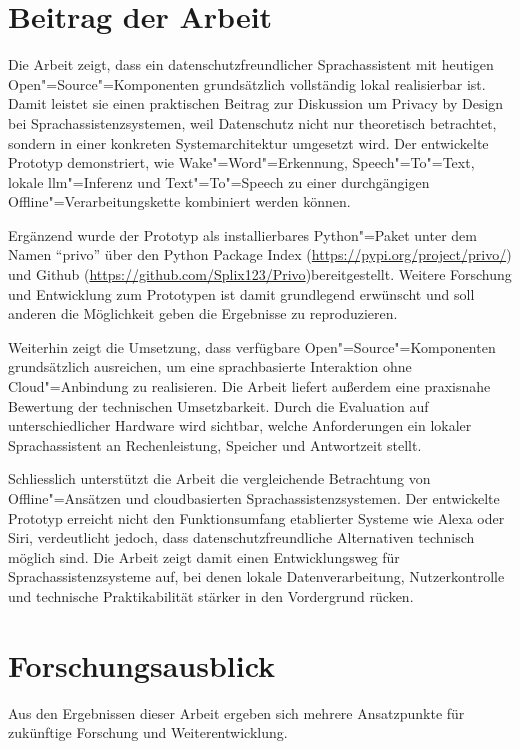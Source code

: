 \section{Beitrag der Arbeit}
\label{sec:Beitrag_der_Arbeit}
Die Arbeit zeigt, dass ein datenschutzfreundlicher Sprachassistent mit heutigen Open"=Source"=Komponenten grundsätzlich vollständig lokal realisierbar ist. Damit leistet sie einen praktischen Beitrag zur Diskussion um Privacy by Design bei Sprachassistenzsystemen, weil Datenschutz nicht nur theoretisch betrachtet, sondern in einer konkreten Systemarchitektur umgesetzt wird. Der entwickelte Prototyp demonstriert, wie Wake"=Word"=Erkennung, Speech"=To"=Text, lokale \gls{llm}"=Inferenz und Text"=To"=Speech zu einer durchgängigen Offline"=Verarbeitungskette kombiniert werden können.

Ergänzend wurde der Prototyp als installierbares Python"=Paket unter dem Namen \enquote{privo} über den Python Package Index (\url{https://pypi.org/project/privo/}) und Github (\url{https://github.com/Splix123/Privo})bereitgestellt. Weitere Forschung und Entwicklung zum Prototypen ist damit grundlegend erwünscht und soll anderen die Möglichkeit geben die Ergebnisse zu reproduzieren.

Weiterhin zeigt die Umsetzung, dass verfügbare Open"=Source"=Komponenten grundsätzlich ausreichen, um eine sprachbasierte Interaktion ohne Cloud"=Anbindung zu realisieren. Die Arbeit liefert außerdem eine praxisnahe Bewertung der technischen Umsetzbarkeit. Durch die Evaluation auf unterschiedlicher Hardware wird sichtbar, welche Anforderungen ein lokaler Sprachassistent an Rechenleistung, Speicher und Antwortzeit stellt.

Schliesslich unterstützt die Arbeit die vergleichende Betrachtung von Offline"=Ansätzen und cloudbasierten Sprachassistenzsystemen. Der entwickelte Prototyp erreicht nicht den Funktionsumfang etablierter Systeme wie Alexa oder Siri, verdeutlicht jedoch, dass datenschutzfreundliche Alternativen technisch möglich sind. Die Arbeit zeigt damit einen Entwicklungsweg für Sprachassistenzsysteme auf, bei denen lokale Datenverarbeitung, Nutzerkontrolle und technische Praktikabilität stärker in den Vordergrund rücken.




\section{Forschungsausblick}
\label{sec:Forschungsausblick}
Aus den Ergebnissen dieser Arbeit ergeben sich mehrere Ansatzpunkte für zukünftige Forschung und Weiterentwicklung.

